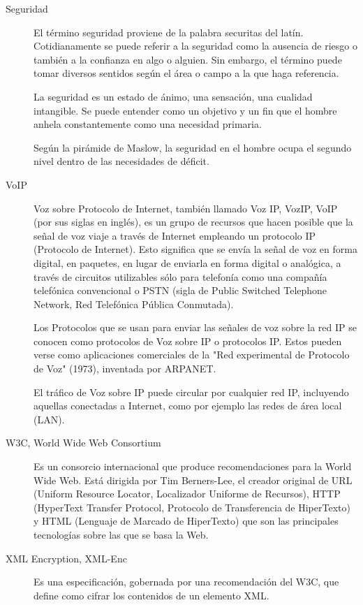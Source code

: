 \begin{description}
\item[Seguridad]
El término seguridad proviene de la palabra securitas del latín. Cotidianamente se puede referir a la seguridad como la ausencia de riesgo o también a la confianza en algo o alguien. Sin embargo, el término puede tomar diversos sentidos según el área o campo a la que haga referencia.

La seguridad es un estado de ánimo, una sensación, una cualidad intangible. Se puede entender como un objetivo y un fin que el hombre anhela constantemente como una necesidad primaria.

Según la pirámide de Maslow, la seguridad en el hombre ocupa el segundo nivel dentro de las necesidades de déficit.

\item[VoIP]
Voz sobre Protocolo de Internet, también llamado Voz IP, VozIP, VoIP (por sus siglas en inglés), es un grupo de recursos que hacen posible que la señal de voz viaje a través de Internet empleando un protocolo IP (Protocolo de Internet). Esto significa que se envía la señal de voz en forma digital, en paquetes, en lugar de enviarla en forma digital o analógica, a través de circuitos utilizables sólo para telefonía como una compañía telefónica convencional o PSTN (sigla de Public Switched Telephone Network, Red Telefónica Pública Conmutada).

Los Protocolos que se usan para enviar las señales de voz sobre la red IP se conocen como protocolos de Voz sobre IP o protocolos IP. Estos pueden verse como aplicaciones comerciales de la "Red experimental de Protocolo de Voz" (1973), inventada por ARPANET.

El tráfico de Voz sobre IP puede circular por cualquier red IP, incluyendo aquellas conectadas a Internet, como por ejemplo las redes de área local (LAN).

\item[W3C, World Wide Web Consortium]
Es un consorcio internacional que produce recomendaciones para la World Wide Web. Está dirigida por Tim Berners-Lee, el creador original de URL (Uniform Resource Locator, Localizador Uniforme de Recursos), HTTP (HyperText Transfer Protocol, Protocolo de Transferencia de HiperTexto) y HTML (Lenguaje de Marcado de HiperTexto) que son las principales tecnologías sobre las que se basa la Web.

\item[XML Encryption, XML-Enc]
Es una especificación, gobernada por una recomendación del W3C, que define como cifrar los contenidos de un elemento XML.


\end{description}

